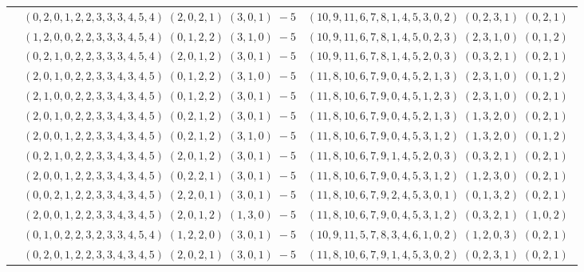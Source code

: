 \documentclass[11pt]{article}
\begin{document}
\begin{longtable}[l]{|c|c|c|}
 \cline{2-3} 
 & $(0 ,2 ,0 ,1 ,2 ,2 ,3 ,3 ,3 ,4 ,5 ,4) \;(2 ,0 ,2 ,1) \;(3 ,0 ,1) \;-5$ & $(10 ,9 ,11 ,6 ,7 ,8 ,1 ,4 ,5 ,3 ,0 ,2) \;(0 ,2 ,3 ,1) \;(0 ,2 ,1) \;$\\ 
 \cline{2-3} 
 & $(1 ,2 ,0 ,0 ,2 ,2 ,3 ,3 ,3 ,4 ,5 ,4) \;(0 ,1 ,2 ,2) \;(3 ,1 ,0) \;-5$ & $(10 ,9 ,11 ,6 ,7 ,8 ,1 ,4 ,5 ,0 ,2 ,3) \;(2 ,3 ,1 ,0) \;(0 ,1 ,2) \;$\\ 
 \cline{2-3} 
 & $(0 ,2 ,1 ,0 ,2 ,2 ,3 ,3 ,3 ,4 ,5 ,4) \;(2 ,0 ,1 ,2) \;(3 ,0 ,1) \;-5$ & $(10 ,9 ,11 ,6 ,7 ,8 ,1 ,4 ,5 ,2 ,0 ,3) \;(0 ,3 ,2 ,1) \;(0 ,2 ,1) \;$\\ 
 \cline{2-3} 
 & $(2 ,0 ,1 ,0 ,2 ,2 ,3 ,3 ,4 ,3 ,4 ,5) \;(0 ,1 ,2 ,2) \;(3 ,1 ,0) \;-5$ & $(11 ,8 ,10 ,6 ,7 ,9 ,0 ,4 ,5 ,2 ,1 ,3) \;(2 ,3 ,1 ,0) \;(0 ,1 ,2) \;$\\ 
 \cline{2-3} 
 & $(2 ,1 ,0 ,0 ,2 ,2 ,3 ,3 ,4 ,3 ,4 ,5) \;(0 ,1 ,2 ,2) \;(3 ,0 ,1) \;-5$ & $(11 ,8 ,10 ,6 ,7 ,9 ,0 ,4 ,5 ,1 ,2 ,3) \;(2 ,3 ,1 ,0) \;(0 ,2 ,1) \;$\\ 
 \cline{2-3} 
 & $(2 ,0 ,1 ,0 ,2 ,2 ,3 ,3 ,4 ,3 ,4 ,5) \;(0 ,2 ,1 ,2) \;(3 ,0 ,1) \;-5$ & $(11 ,8 ,10 ,6 ,7 ,9 ,0 ,4 ,5 ,2 ,1 ,3) \;(1 ,3 ,2 ,0) \;(0 ,2 ,1) \;$\\ 
 \cline{2-3} 
 & $(2 ,0 ,0 ,1 ,2 ,2 ,3 ,3 ,4 ,3 ,4 ,5) \;(0 ,2 ,1 ,2) \;(3 ,1 ,0) \;-5$ & $(11 ,8 ,10 ,6 ,7 ,9 ,0 ,4 ,5 ,3 ,1 ,2) \;(1 ,3 ,2 ,0) \;(0 ,1 ,2) \;$\\ 
 \cline{2-3} 
 & $(0 ,2 ,1 ,0 ,2 ,2 ,3 ,3 ,4 ,3 ,4 ,5) \;(2 ,0 ,1 ,2) \;(3 ,0 ,1) \;-5$ & $(11 ,8 ,10 ,6 ,7 ,9 ,1 ,4 ,5 ,2 ,0 ,3) \;(0 ,3 ,2 ,1) \;(0 ,2 ,1) \;$\\ 
 \cline{2-3} 
 & $(2 ,0 ,0 ,1 ,2 ,2 ,3 ,3 ,4 ,3 ,4 ,5) \;(0 ,2 ,2 ,1) \;(3 ,0 ,1) \;-5$ & $(11 ,8 ,10 ,6 ,7 ,9 ,0 ,4 ,5 ,3 ,1 ,2) \;(1 ,2 ,3 ,0) \;(0 ,2 ,1) \;$\\ 
 \cline{2-3} 
 & $(0 ,0 ,2 ,1 ,2 ,2 ,3 ,3 ,4 ,3 ,4 ,5) \;(2 ,2 ,0 ,1) \;(3 ,0 ,1) \;-5$ & $(11 ,8 ,10 ,6 ,7 ,9 ,2 ,4 ,5 ,3 ,0 ,1) \;(0 ,1 ,3 ,2) \;(0 ,2 ,1) \;$\\ 
 \cline{2-3} 
 & $(2 ,0 ,0 ,1 ,2 ,2 ,3 ,3 ,4 ,3 ,4 ,5) \;(2 ,0 ,1 ,2) \;(1 ,3 ,0) \;-5$ & $(11 ,8 ,10 ,6 ,7 ,9 ,0 ,4 ,5 ,3 ,1 ,2) \;(0 ,3 ,2 ,1) \;(1 ,0 ,2) \;$\\ 
 \cline{2-3} 
 & $(0 ,1 ,0 ,2 ,2 ,3 ,2 ,3 ,3 ,4 ,5 ,4) \;(1 ,2 ,2 ,0) \;(3 ,0 ,1) \;-5$ & $(10 ,9 ,11 ,5 ,7 ,8 ,3 ,4 ,6 ,1 ,0 ,2) \;(1 ,2 ,0 ,3) \;(0 ,2 ,1) \;$\\ 
 \cline{2-3} 
 & $(0 ,2 ,0 ,1 ,2 ,2 ,3 ,3 ,4 ,3 ,4 ,5) \;(2 ,0 ,2 ,1) \;(3 ,0 ,1) \;-5$ & $(11 ,8 ,10 ,6 ,7 ,9 ,1 ,4 ,5 ,3 ,0 ,2) \;(0 ,2 ,3 ,1) \;(0 ,2 ,1) \;$\\ 

\end{longtable}
\end{document}
